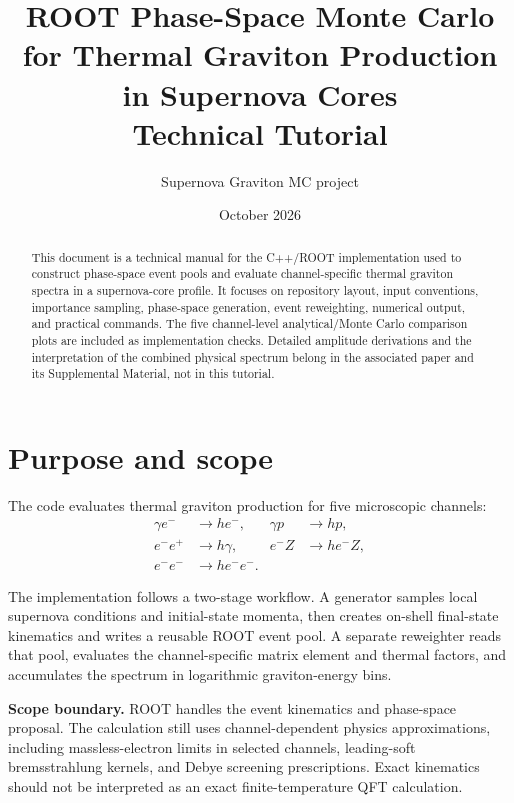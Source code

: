 \documentclass[11pt,a4paper]{article}
\title{\vspace{-1.1cm}\textbf{ROOT Phase-Space Monte Carlo for Thermal Graviton Production in Supernova Cores}\\[0.4em]
\large Technical Tutorial}
\author{Supernova Graviton MC project}
\date{October 2026}
\begin{document}
\maketitle
\thispagestyle{fancy}

\begin{abstract}
This document is a technical manual for the C++/ROOT implementation used to construct phase-space event pools and evaluate channel-specific thermal graviton spectra in a supernova-core profile. It focuses on repository layout, input conventions, importance sampling, phase-space generation, event reweighting, numerical output, and practical commands. The five channel-level analytical/Monte Carlo comparison plots are included as implementation checks. Detailed amplitude derivations and the interpretation of the combined physical spectrum belong in the associated paper and its Supplemental Material, not in this tutorial.
\end{abstract}

\tableofcontents
\newpage

\section{Purpose and scope}

The code evaluates thermal graviton production for five microscopic channels:
\begin{align*}
\gamma e^- &\to h e^-, & \gamma p &\to h p,\\
e^-e^+ &\to h\gamma, & e^-Z &\to h e^-Z,\\
e^-e^- &\to h e^-e^-.
\end{align*}

The implementation follows a two-stage workflow. A generator samples local supernova conditions and initial-state momenta, then creates on-shell final-state kinematics and writes a reusable ROOT event pool. A separate reweighter reads that pool, evaluates the channel-specific matrix element and thermal factors, and accumulates the spectrum in logarithmic graviton-energy bins.

\begin{center}
\end{center}

\textbf{Scope boundary.} ROOT handles the event kinematics and phase-space proposal. The calculation still uses channel-dependent physics approximations, including massless-electron limits in selected channels, leading-soft bremsstrahlung kernels, and Debye screening prescriptions. Exact kinematics should not be interpreted as an exact finite-temperature QFT calculation.
\end{document}
